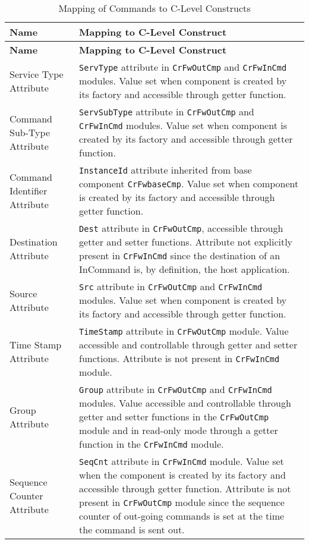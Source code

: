 \documentclass{pnp_article}
\begin{document}
\begin{longtable}{|>{\raggedright}p{2.0cm}|p{11.3cm}|}
\caption{Mapping of Commands to C-Level Constructs} \label{tab:CmdConceptMapping}\\
\hline
\rowcolor{light-gray}
\textbf{Name} & \textbf{Mapping to C-Level Construct} \\
\hline\hline
\endfirsthead
\rowcolor{light-gray}
\textbf{Name} & \textbf{Mapping to C-Level Construct} \\
\hline\hline
\endhead
Service Type Attribute & \texttt{ServType} attribute in \texttt{CrFwOutCmp} and \texttt{CrFwInCmd} modules. Value set when component is created by its factory and accessible through getter function. \\
\hline
Command Sub-Type Attribute & \texttt{ServSubType} attribute in \texttt{CrFwOutCmp} and \texttt{CrFwInCmd} modules. Value set when component is created by its factory and accessible through getter function. \\
\hline
Command Identifier Attribute & \texttt{InstanceId} attribute inherited from base component \texttt{CrFwbaseCmp}. Value set when component is created by its factory and accessible through getter function. \\
\hline
Destination Attribute & \texttt{Dest} attribute in \texttt{CrFwOutCmp}, accessible through getter and setter functions. Attribute not explicitly present in \texttt{CrFwInCmd} since the destination of an InCommand is, by definition, the host application. \\
\hline
Source Attribute & \texttt{Src} attribute in \texttt{CrFwOutCmp} and \texttt{CrFwInCmd} modules. Value set when component is created by its factory and accessible through getter function. \\
\hline
Time Stamp Attribute & \texttt{TimeStamp} attribute in \texttt{CrFwOutCmp} module. Value accessible and controllable through getter and setter functions. Attribute is not present in \texttt{CrFwInCmd} module. \\
\hline
Group Attribute & \texttt{Group} attribute in \texttt{CrFwOutCmp} and \texttt{CrFwInCmd} modules. Value accessible and controllable through getter and setter functions in the \texttt{CrFwOutCmp} module and in read-only mode through a getter function in the \texttt{CrFwInCmd} module.  \\
\hline
Sequence Counter Attribute & \texttt{SeqCnt} attribute in \texttt{CrFwInCmd} module. Value set when the component is created by its factory and accessible through getter function. Attribute is not present in \texttt{CrFwOutCmp} module since the sequence counter of out-going commands is set at the time the command is sent out. \\

\end{longtable}
\end{document}
